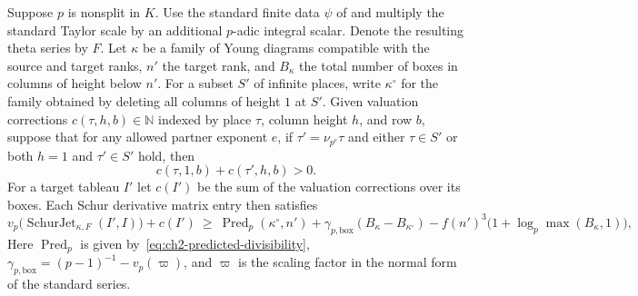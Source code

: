 \begin{lemma}
\label{lem:a-charged-schur-jet}
\label{thm:ch2-jet-count}
\emitthmsource
Suppose $p$ is nonsplit in $K$. Use the standard finite data $\psi$ of  and multiply the standard Taylor scale by an additional $p$-adic integral scalar. Denote the resulting theta series by $F$. Let $\kappa$ be a family of Young diagrams compatible with the source and target ranks, $n'$ the target rank, and $B_\kappa$ the total number of boxes in columns of height below $n'$. For a subset $S'$ of infinite places, write $\kappa^\circ$ for the family obtained by deleting all columns of height $1$ at $S'$. Given valuation corrections $c(\tau,h,b)\in\mathbb N$ indexed by place $\tau$, column height $h$, and row $b$, suppose that for any allowed partner exponent $e$, if $\tau'=\nu_{p^e}\tau$ and either $\tau\in S'$ or both $h=1$ and $\tau'\in S'$ hold, then
\[
             c(\tau,1,b)+c(\tau',h,b)>0.
\]
For a target tableau $I'$ let $c(I')$ be the sum of the valuation corrections over its boxes. Each Schur derivative matrix entry then satisfies
\[
 v_p\bigl(\operatorname{SchurJet}_{\kappa,F}(I',I)\bigr)+c(I')
 \ \ge\
 \operatorname{Pred}_p(\kappa^\circ,n')
 +\gamma_{p,\mathrm{box}}(B_\kappa-B_{\kappa^\circ})
 - f(n')^3\bigl(1+\log_p\max(B_\kappa,1)\bigr),
\]
Here $\operatorname{Pred}_p$ is given by~\eqref{eq:ch2-predicted-divisibility}, $\gamma_{p,\mathrm{box}}=(p-1)^{-1}-v_p(\varpi)$, and $\varpi$ is the scaling factor in the normal form of the standard series.
\end{lemma}
